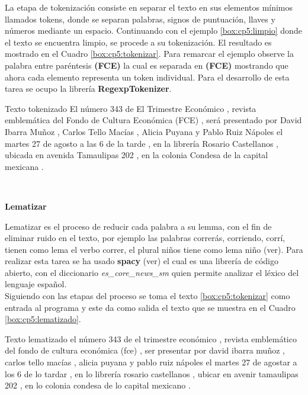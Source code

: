 La etapa de tokenización consiste en separar el texto en sus elementos mínimos llamados tokens, donde se separan palabras, signos de puntuación, llaves y números mediante un espacio. Continuando con el ejemplo \ref{box:cp5:limpio} donde el texto se encuentra limpio, se procede a su tokenización. El resultado es mostrado en el Cuadro \ref{box:cp5:tokenizar}. Para remarcar el ejemplo observe la palabra entre paréntesis \textbf{(FCE)} la cual es separada en \textbf{(FCE)} mostrando que ahora cada elemento representa un token individual. Para el desarrollo de esta tarea se ocupo la librería \textbf{RegexpTokenizer}.\\

\begin{mygraybox}[label={box:cp5:tokenizar}]{Texto tokenizado} 
El número 343 de El Trimestre Económico , revista emblemática del Fondo de Cultura 
Económica (FCE) , será presentado por David Ibarra Muñoz , Carlos Tello Macías , Alicia Puyana y Pablo Ruiz Nápoles el martes 27 de agosto a las 6 de la tarde , en la librería Rosario Castellanos , ubicada en avenida Tamaulipas 202 , en la colonia Condesa de la capital mexicana .
\end{mygraybox}
\ \\
\begin{large}
\textbf{Lematizar}\\
\end{large}

Lematizar es el proceso de reducir cada palabra a su lemma, con el fin de eliminar ruido en el texto, por ejemplo las palabras correrás, corriendo, corrí, tienen como lema el verbo correr, el plural niños tiene como lema niño (ver). Para realizar esta tarea se ha usado \textbf{spacy} (ver) el cual es una librería de código abierto, con el diccionario \textit{es\_core\_news\_sm} quien permite analizar el léxico del lenguaje español.\\

Siguiendo con las etapas del proceso se toma el texto \ref{box:cp5:tokenizar} como entrada al programa y este da como salida el texto que se muestra en el Cuadro \ref{box:cp5:lematizado}.\\

\begin{mygraybox}[label={box:cp5:lematizado}]{Texto lematizado} 
el número 343 de el trimestre económico , revista emblemático del fondo de cultura económica (fce) , ser presentar por david ibarra muñoz , carlos tello macías , alicia puyana y pablo ruiz nápoles el martes 27 de agostar a los 6 de lo tardar , en lo librería rosario castellanos , ubicar en avenir tamaulipas 202 , en lo colonia condesa de lo capital mexicano .
\end{mygraybox}
\ \\

